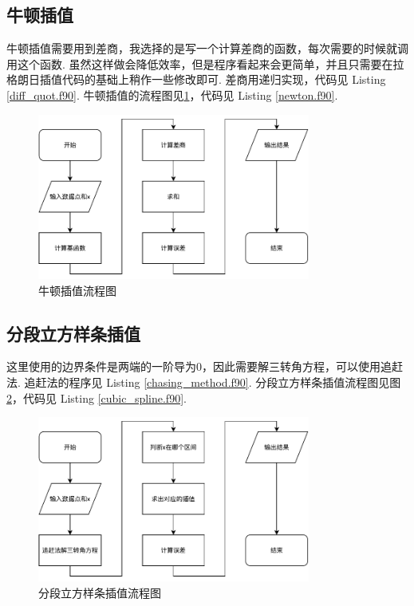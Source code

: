 \documentclass{article}
\begin{document}
	\subsection{牛顿插值}
	牛顿插值需要用到差商，我选择的是写一个计算差商的函数，每次需要的时候就调用这个函数. 虽然这样做会降低效率，但是程序看起来会更简单，并且只需要在拉格朗日插值代码的基础上稍作一些修改即可. 差商用递归实现，代码见 Listing \ref{diff_quot.f90}. 牛顿插值的流程图见\ref{fig:newton}，代码见 Listing \ref{newton.f90}.
	\begin{figure}[h!tb]
		\centering
		\includegraphics[width=0.8\textwidth]{./utils/newton.pdf}
		\caption{ 牛顿插值流程图\label{fig:newton}}
	\end{figure}
	
	
	\subsection{分段立方样条插值}
	这里使用的边界条件是两端的一阶导为0，因此需要解三转角方程，可以使用追赶法. 追赶法的程序见 Listing \ref{chasing_method.f90}. 分段立方样条插值流程图见图\ref{fig:cubic_spline}，代码见 Listing \ref{cubic_spline.f90}. 
	\begin{figure}[h!tb]
		\centering
		\includegraphics[width=0.8\textwidth]{./utils/cubic_spline.pdf}
		\caption{ 分段立方样条插值流程图\label{fig:cubic_spline}}
	\end{figure}
	
	
	
\end{document}
